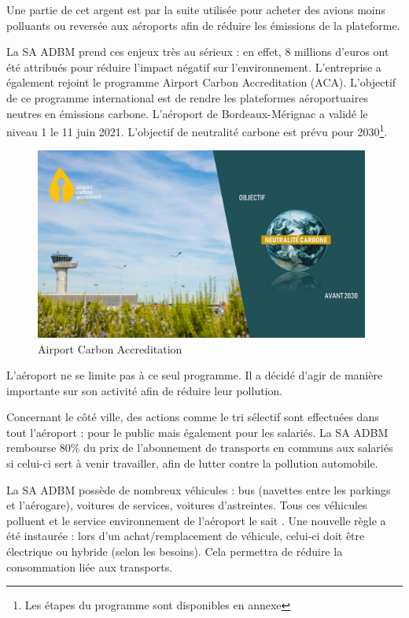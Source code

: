 Une partie de cet argent est par la suite utilisée pour acheter des avions moins polluants ou reversée aux aéroports afin de réduire les émissions de la plateforme.\newline

La SA ADBM prend ces enjeux très au sérieux : en effet, 8 millions d'euros ont été attribués pour réduire l'impact négatif sur l'environnement.
L'entreprise a également rejoint le programme Airport Carbon Accreditation (ACA). L'objectif de ce programme international est de rendre les plateformes aéroportuaires neutres en émissions carbone.
L'aéroport de Bordeaux-Mérignac a validé le niveau 1 le 11 juin 2021. L'objectif de neutralité carbone est prévu pour 2030\footnote{Les étapes du programme sont disponibles en annexe}.

\begin{figure}[hbt!]
  \centering
  \includegraphics[width=11cm]{Images/aca2030.jpg}
  \caption{Airport Carbon Accreditation}
  \label{fig:aca2030}
\end{figure}


L'aéroport ne se limite pas à ce seul programme. Il a décidé d'agir de manière importante sur son activité afin de réduire leur pollution.


Concernant le côté ville, des actions comme le tri sélectif sont effectuées dans tout l'aéroport : pour le public mais également pour les salariés. La SA ADBM rembourse 80\% du prix de l'abonnement de transports en communs aux salariés si celui-ci sert à venir travailler, afin de lutter contre la pollution automobile.


La SA ADBM possède de nombreux véhicules : bus (navettes entre les parkings et l'aérogare), voitures de services, voitures d'astreintes. Tous ces véhicules polluent et le service environnement de l'aéroport le sait . Une nouvelle règle a été instaurée : lors d'un achat/remplacement de véhicule, celui-ci doit être électrique ou hybride (selon les besoins). Cela permettra de réduire la consommation liée aux transports.\newline


